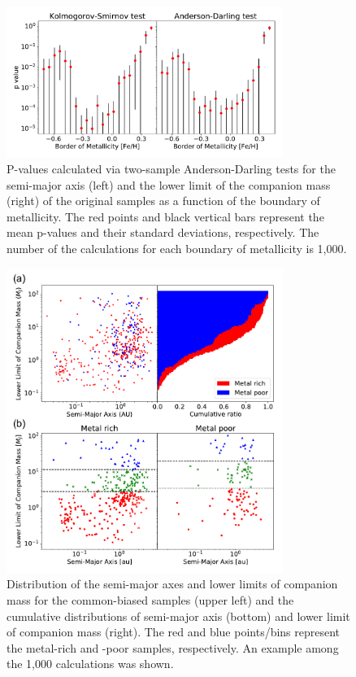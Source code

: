 \documentclass[twocolumn, dvipdfmx]{aastex62}
\begin{document}
\begin{CJK*}{UTF8}{min}
\begin{figure}[t]
\begin{center}
\includegraphics[width=9cm]{../../../Figure/pvalues_plot.pdf}
\caption{P-values calculated via two-sample Anderson-Darling tests for the semi-major axis (left) and the lower limit of the companion mass (right) of the original samples as a function of the boundary of metallicity. The red points and black vertical bars represent the mean p-values and their standard deviations, respectively. The number of the calculations for each boundary of metallicity is 1,000. \label{fig:pvalue}}
\end{center}
\end{figure}

\begin{figure}[t]
\begin{center}
\includegraphics[width=9cm]{../../../Figure/a_Mp.pdf}
\caption{Distribution of the semi-major axes and lower limits of companion mass for the common-biased samples (upper left) and the cumulative distributions of semi-major axis (bottom) and lower limit of companion mass (right). The red and blue points/bins represent the metal-rich and -poor samples, respectively. An example among the 1,000 calculations was shown. \label{fig:a_Mp}}
\end{center}
\end{figure}



\end{CJK*}
\end{document}
